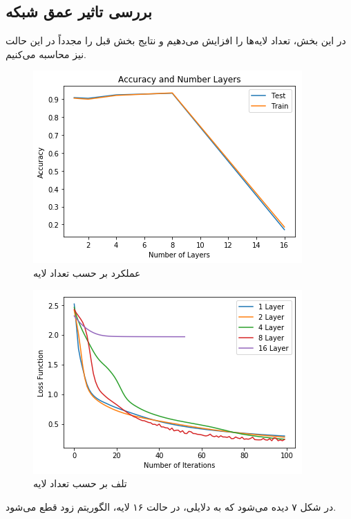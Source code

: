 \documentclass[a4paper]{article}
\begin{document}
\begin{large}
\section{بررسی تاثیر عمق شبکه}
در این بخش، تعداد لایه‌ها را افزایش می‌دهیم و نتایج بخش‌ قبل را مجدداً در این حالت نیز محاسبه می‌کنیم.
\begin{figure}[h!]
	\centering
	\includegraphics[scale=0.7]{7.png}
	\caption{عملکرد بر حسب تعداد لایه}
\end{figure}
\begin{figure}[h!]
	\centering
	\includegraphics[scale=0.7]{8.png}
	\caption{تلف بر حسب تعداد لایه}
\end{figure}
\end{large}
در شکل ۷ دیده می‌شود که به دلایلی، در حالت ۱۶ لایه، الگوریتم 
زود قطع می‌شود. 
\end{document}
